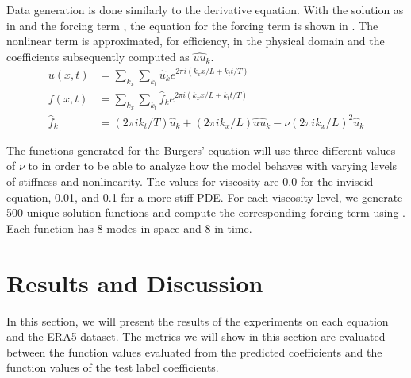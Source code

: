 \documentclass[preprint,12pt,times,authoryear]{elsarticle}
\begin{document}
Data generation is done similarly to the derivative equation. With the solution as in  and the forcing term , the equation for the forcing term is shown in . The nonlinear term is approximated, for efficiency, in the physical domain and the coefficients subsequently computed as \(\hat{uu}_k\).
\begin{align}
  u\left(x, t \right) & = \sum_{k_{x}} \sum_{k_{t}} \hat{u}_k e^{2\pi i(k_{x}x/L+k_{t}t/T)} \label{eq:fourier_field}                                         \\
  f\left(x, t \right) & = \sum_{k_{x}}\sum_{k_{t}} \hat{f}_k e^{2\pi i(k_{x}x/L+k_{t}t/T)} \label{eq:fourier_force}                                          \\
  \hat{f}_k           & = (2\pi i k_{t}/T) \hat{u}_k + (2\pi i k_{x}/L)\hat{uu}_k - \nu{(2\pi i k_{x}/L)}^2\hat{u}_k \label{eq:forced_viscous_burgers_coeff}
\end{align}

The functions generated for the Burgers' equation will use three different values of \(\nu{}\) to in order to be able to analyze how the model behaves with varying levels of stiffness and nonlinearity. The values for viscosity are \num{0.0} for the inviscid equation, \num{0.01}, and \num{0.1} for a more stiff PDE\@. For each viscosity level, we generate \num{500} unique solution functions and compute the corresponding forcing term using . Each function has 8 modes in space and 8 in time.


\section{Results and Discussion}
In this section, we will present the results of the experiments on each equation and the ERA5 dataset. The metrics we will show in this section are evaluated between the function values evaluated from the predicted coefficients and the function values of the test label coefficients.
\end{document}
